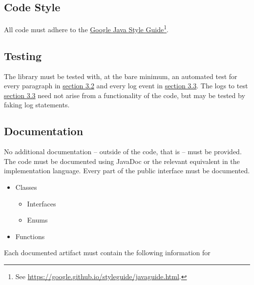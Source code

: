 \documentclass[11pt]{article} %
\begin{document}
    \subsection{Code Style}\label{sec:3.4}

    All code must adhere to the \href{https://google.github.io/styleguide/javaguide.html}{Google Java Style Guide}\footnote{See \url{https://google.github.io/styleguide/javaguide.html}.}.

    \subsection{Testing}\label{sec:3.5}

    The library must be tested with, at the bare minimum, an automated test for every paragraph in \hyperref[sec:3.2]{section 3.2} and every log event in \hyperref[sec:3.3]{section 3.3}. The logs to test \hyperref[sec:3.3]{section 3.3} need not arise from a functionality of the code, but may be tested by faking log statements.

    \subsection{Documentation}\label{sec:3.6}

    No additional documentation -- outside of the code, that is -- must be provided. The code must be documented using JavaDoc or the relevant equivalent in the implementation language. Every part of the public interface must be documented.

    \begin{itemize}
        \item Classes
        \begin{itemize}
            \item Interfaces
            \item Enums
        \end{itemize}
        \item Functions
    \end{itemize}

    Each documented artifact must contain the following information for
\end{document}
